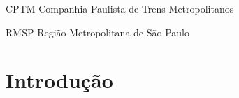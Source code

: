 \documentclass[
	12pt,				%
	openright,			%
	oneside,
	a4paper,			%
	english,			%
	french,				%
	spanish,			%
	brazil,				%
	]{abntex2}
\begin{document}

\frenchspacing 


\imprimircapa

\imprimirfolhaderosto


\listoffigures*
\cleardoublepage

\listoftables*
\cleardoublepage

\begin{siglas}
  \item[CPTM] Companhia Paulista de Trens Metropolitanos
  \item[RMSP] Região Metropolitana de São Paulo
\end{siglas}


\tableofcontents*
\cleardoublepage


\textual

\chapter*[Introdução]{Introdução}
\end{document}
